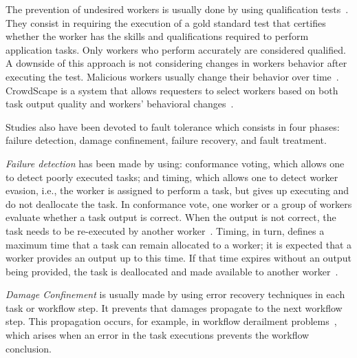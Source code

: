 \documentclass[11pt]{bmc_article_s50}
\begin{document}
The prevention of undesired workers is usually done by using qualification tests~\cite{Chen:chiHcomp:2011}. They consist in requiring the execution of a gold standard test that certifies whether the worker has the skills and qualifications required to perform application tasks. Only workers who perform accurately are considered qualified. A downside of this approach is not considering changes in workers behavior after executing the test. Malicious workers usually change their behavior over time~\cite{Vuurens-CIR2011}. CrowdScape is a system that allows requesters to select workers based on both task output quality and workers' behavioral changes~\cite{Rzeszotarski:UIST:2012}.

Studies also have been devoted to fault tolerance which consists in four phases: failure detection, damage confinement, failure recovery, and fault treatment.

\textit{Failure detection} has been made by using:  conformance voting, which allows one to detect poorly executed tasks; and  timing, which allows one to detect worker evasion, i.e., the worker is assigned to perform a task, but gives up executing and do not deallocate the task. In conformance vote, one worker or a group of workers evaluate whether a task output is correct. When the output is not correct, the task needs to be re-executed by another worker~\cite{Kulkarni2012}. Timing, in turn, defines a maximum time that a task can remain allocated to a worker; it is expected that a worker provides an output up to this time. If that time expires without an output being provided, the task is deallocated and made available to another worker~\cite{Bernstein:2010}.

\textit{Damage Confinement} is usually made by using error recovery techniques in each task or workflow step. It prevents that damages propagate to the next workflow step. This propagation occurs, for example, in workflow derailment problems~\cite{Kulkarni2011b}, which arises when an error in the task executions prevents the workflow conclusion.
\end{document}
